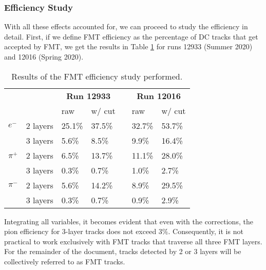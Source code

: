 \subsubsection{Efficiency Study}
\label{14.14::efficiency_study}
    With all these effects accounted for, we can proceed to study the efficiency in detail.
    First, if we define FMT efficiency as the percentage of DC tracks that get accepted by FMT, we get the results in Table \ref{tab::14.14::fmt_efficiency_study} for runs 12933 (Summer 2020) and 12016 (Spring 2020).

    \begin{table}
        \begin{center}
            \begin{tabularx}{0.60\textwidth}{llllcll}
                \toprule
                & & \multicolumn{2}{c}{\textbf{Run 12933}}  & & \multicolumn{2}{c}{\textbf{Run 12016}} \\
                                &          & raw  & w/ cut   & & raw  & w/ cut   \\
                \midrule \midrule
                \textbf{$e^-$}   & 2 layers & 25.1\% & 37.5\% & & 32.7\% & 53.7\% \\
                                 & 3 layers &  5.6\% &  8.5\% & &  9.9\% & 16.4\% \\
                \midrule
                \textbf{$\pi^+$} & 2 layers &  6.5\% & 13.7\% & & 11.1\% & 28.0\% \\
                                 & 3 layers &  0.3\% &  0.7\% & &  1.0\% &  2.7\% \\
                \midrule
                \textbf{$\pi^-$} & 2 layers &  5.6\% & 14.2\% & &  8.9\% & 29.5\% \\
                                 & 3 layers &  0.3\% &  0.7\% & &  0.9\% &  2.9\% \\
                \bottomrule
            \end{tabularx}
        \end{center}

        \caption{Results of the FMT efficiency study performed.}
        \label{tab::14.14::fmt_efficiency_study}
    \end{table}

    Integrating all variables, it becomes evident that even with the corrections, the pion efficiency for 3-layer tracks does not exceed $3\%$.
    Consequently, it is not practical to work exclusively with FMT tracks that traverse all three FMT layers.
    For the remainder of the document, tracks detected by 2 or 3 layers will be collectively referred to as FMT tracks.

